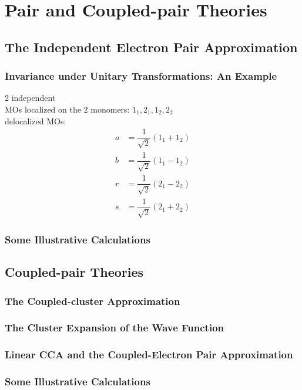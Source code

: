 \documentclass[a4paper]{article}
\numberwithin{equation}{section}
\begin{document}
\section{Pair and Coupled-pair Theories}
\subsection{The Independent Electron Pair Approximation}
\subsubsection{Invariance under Unitary Transformations: An Example}
2 independent  \\
MOs localized on the 2 monomers: $ 1_1, 2_1, 1_2, 2_2 $\\
delocalized MOs: 
\begin{align}
a &= \dfrac{1}{\sqrt{2}} (1_1 + 1_2) \\
b &= \dfrac{1}{\sqrt{2}} (1_1 - 1_2) \\
r &= \dfrac{1}{\sqrt{2}} (2_1 - 2_2) \\
s &= \dfrac{1}{\sqrt{2}} (2_1 + 2_2) 
\end{align}
\subsubsection{Some Illustrative Calculations}

\subsection{Coupled-pair Theories}
\subsubsection{The Coupled-cluster Approximation}

\subsubsection{The Cluster Expansion of the Wave Function}

\subsubsection{Linear CCA and the Coupled-Electron Pair Approximation}

\subsubsection{Some Illustrative Calculations}
\end{document}
